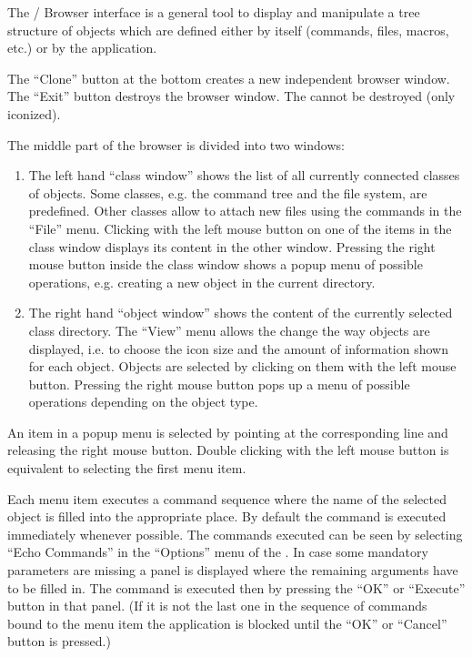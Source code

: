The \KUIP/\MOTIF{} Browser interface is a general tool to display and
manipulate a tree structure of objects which are defined either by \KUIP{}
itself (commands, files, macros, etc.) or by the application.

The ``Clone'' button at the bottom creates a new independent browser window.
The ``Exit'' button destroys the browser window. The \MB{} cannot be
destroyed (only iconized).

The middle part of the browser is divided into two windows:

\begin{enumerate}
\item The left hand ``class window'' shows the list of all currently connected
   classes of objects.  Some classes, e.g. the command tree and the file
   system, are predefined.  Other classes allow to attach new files using the
   commands in the ``File'' menu.  Clicking with the left mouse button on
   one of
   the items in the class window displays its content in the other window.
   Pressing the right mouse button inside the class window shows a popup menu
   of possible operations, e.g. creating a new object in the current
   directory.

\item The right hand ``object window'' shows the content of the currently
   selected class directory.  The ``View'' menu allows the change the way
   objects are displayed, i.e. to choose the icon size and the amount of
   information shown for each object.  Objects are selected by clicking on
   them with the left mouse button.  Pressing the right mouse button pops up a
   menu of possible operations depending on the object type.
\end{enumerate}

   An item in a popup menu is selected by pointing at the corresponding line
   and releasing the right mouse button.  Double clicking with the left mouse
   button is equivalent to selecting the first menu item.

   Each menu item executes a command sequence where the name of the selected
   object is filled into the appropriate place.  By default the command is
   executed immediately whenever possible. The commands executed can be seen
   by selecting ``Echo Commands'' in the ``Options'' menu of the \EW.
   In case some mandatory parameters are missing a panel is displayed
   where the remaining arguments have to be filled in.  The command is
   executed then by pressing the ``OK'' or ``Execute'' button in that panel.
  (If it is not the last one in the sequence of commands bound to the menu item
 the application is blocked until the ``OK'' or ``Cancel'' button is pressed.)

